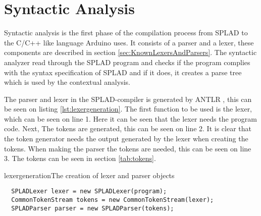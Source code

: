 \section{Syntactic Analysis}
\label{sec:syntactic}
Syntactic analysis is the first phase of the compilation process from SPLAD to the C/C++ like language Arduino uses. It consists of a parser and a lexer, these components are described in section \ref{sec:KnownLexersAndParsers}. The syntactic analyzer read through the SPLAD program and checks if the program complies with the syntax specification of SPLAD and if it does, it creates a parse tree which is used by the contextual analysis.

The parser and lexer in the SPLAD-compiler is generated by ANTLR \citep{ANTLR}, this can be seen on listing \ref{lst:lexergeneration}. The first function to be used is the lexer, which can be seen on line 1. Here it can be seen that the lexer needs the program code. Next, The tokens are generated, this can be seen on line 2. It is clear that the token generator needs the output generated by the lexer when creating the tokens. When making the parser the tokens are needed, this can be seen on line 3. The tokens can be seen in section \ref{tab:tokens}.

\begin{code}{lexergeneration}{The creation of lexer and parser objects}
\begin{lstlisting}
  SPLADLexer lexer = new SPLADLexer(program);
  CommonTokenStream tokens = new CommonTokenStream(lexer);
  SPLADParser parser = new SPLADParser(tokens);
\end{lstlisting}
\end{code}


